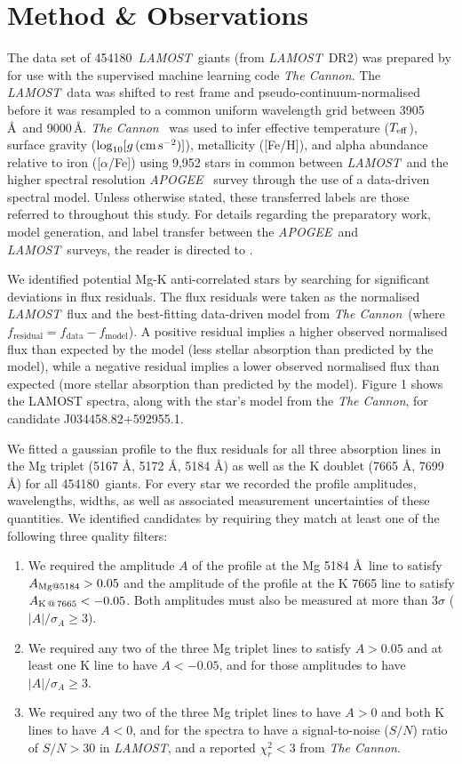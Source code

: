 \documentclass[a4paper,fleqn,usenatbib]{mnras}
\newcommand{\LamostGiants}{454180}
\newcommand{\project}[1]{\emph{#1}}
\newcommand{\lamost}{\project{LAMOST}}
\newcommand{\apogee}{\project{APOGEE}}
\newcommand{\tc}{\project{The Cannon}}
\newcommand{\teff}{T_{\rm eff}}
\newcommand{\logg}{\log_{10}[g\,({\rm cm\,s}^{-2})]}
\begin{document}
\section{Method \& Observations}
\label{sec:method}
The data set of \LamostGiants\ \lamost\ giants (from \lamost\ DR2) was prepared by \citet{ho2017} for use with the supervised machine learning code \tc. The \lamost\ data was shifted to rest frame and pseudo-continuum-normalised before it was resampled to a common uniform wavelength grid between 3905\,\AA\ and 9000\,\AA. \tc\ \citep{ness2016,ho2017} was used to infer effective temperature ($\teff$), surface gravity ($\logg$), metallicity ([Fe/H]), and alpha abundance relative to iron ([$\alpha$/Fe]) using 9,952 stars in common between \lamost\ and the higher spectral resolution \apogee\ \citep{alam2015} survey through the use of a data-driven spectral model. Unless otherwise stated, these transferred labels are those referred to throughout this study. For details regarding the preparatory work, model generation, and label transfer between the \apogee\ and \lamost\ surveys, the reader is directed to \citet{ho2017}. 

We identified potential Mg-K anti-correlated stars by searching for significant deviations in flux residuals. The flux residuals were taken as the normalised \lamost\ flux and the best-fitting data-driven model from \tc\ (where $f_{\textrm{residual}} = f_{\textrm{data}} - f_{\textrm{model}}$). A positive residual implies a higher observed normalised flux than expected by the model (less stellar absorption than predicted by the model), while a negative residual implies a lower observed normalised flux than expected (more stellar absorption than predicted by the model). Figure 1 shows the LAMOST spectra, along with the star's model from the \tc, for candidate J034458.82+592955.1.

We fitted a gaussian profile to the flux residuals for all three absorption lines in the Mg triplet (5167 \AA, 5172 \AA, 5184 \AA) as well as the K doublet (7665 \AA, 7699 \AA) for all \LamostGiants\ giants. For every star we recorded the profile amplitudes, wavelengths, widths, as well as associated measurement uncertainties of these quantities. We identified candidates by requiring they match at least one of the following three quality filters:
\begin{enumerate}
\item We required the amplitude $A$ of the profile at the Mg 5184 \AA \ line to satisfy $A_{{\rm Mg} @ 5184} > 0.05$ and the amplitude of the profile at the K 7665 line to satisfy $A_{{\rm K}\,@\,7665} < -0.05$. Both amplitudes must also be measured at more than $3\sigma$ ($|A|/\sigma_{A} \geq 3$).
\item We required any two of the three Mg triplet lines to satisfy $A > 0.05$ and at least one K line to have $A < -0.05$, and for those amplitudes to have $|A|/\sigma_{A} \geq 3$.
\item We required any two of the three Mg triplet lines to have $A > 0$ and both K lines to have $A < 0$, and for the spectra to have a signal-to-noise ($S/N$) ratio of $S/N > 30$ in \lamost, and a reported $\chi_{r}^2 < 3$ from \tc.
\end{enumerate} 
 
\end{document}
